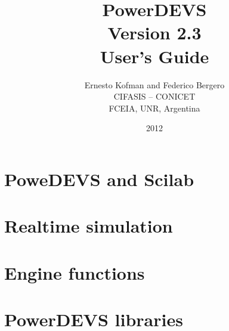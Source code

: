 \documentclass[a4paper,12pt]{book}
\title{\Huge{\textbf{PowerDEVS}}\\ \vspace{1cm} \large{Version 2.3} \\ \vspace{1cm} \huge{User's Guide}\vspace{2cm}}
\author{ Ernesto Kofman and Federico Bergero\vspace{2cm} \\ CIFASIS -- CONICET\\FCEIA, UNR, Argentina}
\date{2012}
\begin{document}
 \maketitle

 \tableofcontents





%








\chapter{PoweDEVS and Scilab}

\chapter{Realtime simulation}

\appendix
\chapter{Engine functions}

\chapter{PowerDEVS libraries}
\end{document}
